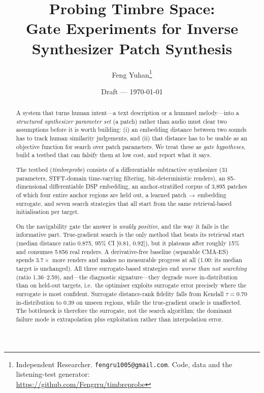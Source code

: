 \documentclass[11pt]{article}
\title{\bfseries Probing Timbre Space:\\ Gate Experiments for Inverse Synthesizer Patch Synthesis}
\author{Feng Yuhan\thanks{%
  Independent Researcher.  \texttt{fengru1005@gmail.com}.
  Code, data and the listening-test generator:\\
  \url{https://github.com/Fengrru/timbreprobe}}}
\date{Draft --- \today}
\newcommand{\rGS}{2.59}
\newcommand{\rGST}{1.36}
\newcommand{\rGT}{0.875}
\newcommand{\rGTci}{[0.81, 0.92]}
\newcommand{\rCMA}{1.00}
\newcommand{\renGT}{5\,856}
\begin{document}
\maketitle

\begin{abstract}
\noindent
A system that turns human intent---a text description or a hummed
melody---into a \emph{structured synthesizer parameter set} (a patch) rather
than audio must clear two assumptions before it is worth building: (i) an
embedding distance between two sounds has to track human similarity
judgements, and (ii) that distance has to be usable as an objective function
for search over patch parameters. We treat these as \emph{gate hypotheses},
build a testbed that can falsify them at low cost, and report what it says.

The testbed (\emph{timbreprobe}) consists of a differentiable subtractive
synthesizer (31 parameters, STFT-domain time-varying filtering,
bit-deterministic renders), an 85-dimensional differentiable DSP embedding, an
anchor-stratified corpus of 3{,}895 patches of which four entire anchor regions
are held out, a learned patch\,$\rightarrow$\,embedding surrogate, and seven
search strategies that all start from the same retrieval-based initialisation
per target.

On the navigability gate the answer is \emph{weakly positive}, and the way it
fails is the informative part. True-gradient search is the only method that
beats its retrieval start (median distance ratio \rGT, 95\% CI \rGTci), but it
plateaus after roughly 15\% and consumes \renGT{} real renders. A
derivative-free baseline (separable CMA-ES) spends $3.7\times$ more renders and
makes no measurable progress at all (\rCMA: its median target is unchanged).
All three surrogate-based strategies end \emph{worse than not searching}
(ratio \rGST--\rGS), and---the diagnostic signature---they
degrade \emph{more} in-distribution than on held-out targets, i.e.\ the
optimiser exploits surrogate error precisely where the surrogate is most
confident. Surrogate distance-rank fidelity falls from Kendall $\tau=0.70$
in-distribution to $0.39$ on unseen regions, while the true-gradient oracle is
unaffected. The bottleneck is therefore the surrogate, not the search
algorithm; the dominant failure mode is extrapolation plus exploitation rather
than interpolation error.


\end{abstract}
\end{document}
